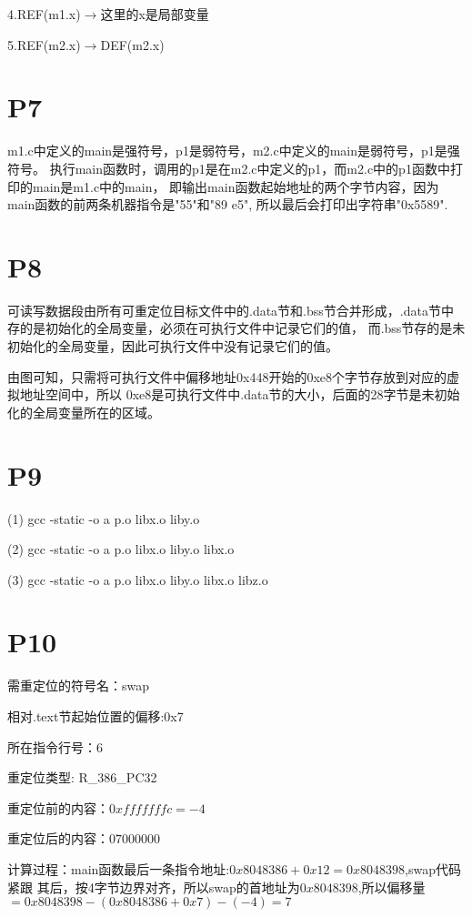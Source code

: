 \documentclass{article}
\begin{document}
4.REF(m1.x)$\longrightarrow$这里的x是局部变量

5.REF(m2.x)$\longrightarrow$DEF(m2.x)


\section*{P7}

m1.c中定义的main是强符号，p1是弱符号，m2.c中定义的main是弱符号，p1是强符号。
执行main函数时，调用的p1是在m2.c中定义的p1，而m2.c中的p1函数中打印的main是m1.c中的main，
即输出main函数起始地址的两个字节内容，因为main函数的前两条机器指令是"55"和"89 e5",
所以最后会打印出字符串"0x5589\n".


\section*{P8}

可读写数据段由所有可重定位目标文件中的.data节和.bss节合并形成，.data节中存的是初始化的全局变量，必须在可执行文件中记录它们的值，
而.bss节存的是未初始化的全局变量，因此可执行文件中没有记录它们的值。

由图可知，只需将可执行文件中偏移地址0x448开始的0xe8个字节存放到对应的虚拟地址空间中，所以
0xe8是可执行文件中.data节的大小，后面的28字节是未初始化的全局变量所在的区域。

\section*{P9}
(1) gcc -static -o a p.o libx.o liby.o

(2) gcc -static -o a p.o libx.o liby.o libx.o

(3) gcc -static -o a p.o libx.o liby.o libx.o libz.o

\section*{P10}
需重定位的符号名：swap

相对.text节起始位置的偏移:0x7

所在指令行号：6

重定位类型: R\_386\_PC32

重定位前的内容：$0xfffffffc=-4$

重定位后的内容：$07 00 00 00$

计算过程：main函数最后一条指令地址:$0x8048386+0x12=0x8048398$,swap代码紧跟
其后，按4字节边界对齐，所以swap的首地址为$0x8048398$,所以偏移量$=0x8048398-(0x8048386+0x7)-(-4)=7$
\end{document}

